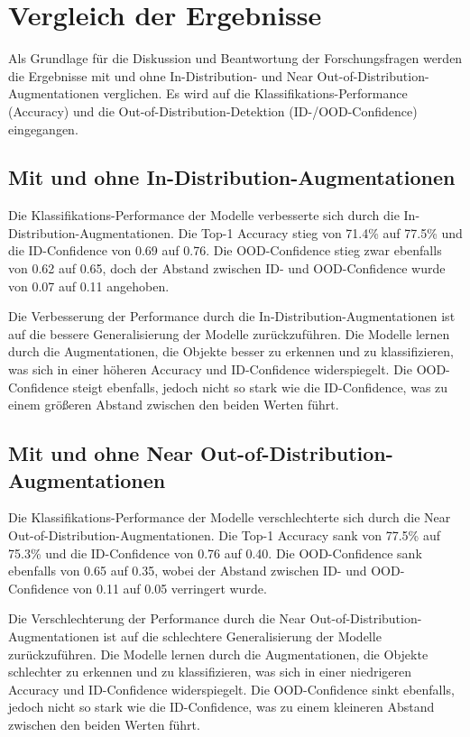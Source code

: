 \section{Vergleich der Ergebnisse} \label{sec:results-comparison}

Als Grundlage für die Diskussion und Beantwortung der Forschungsfragen werden die Ergebnisse mit und ohne In-Distribution- und Near Out-of-Distribution-Augmentationen verglichen. Es wird auf die Klassifikations-Performance (Accuracy) und die Out-of-Distribution-Detektion (ID-/OOD-Confidence) eingegangen.

\subsection{Mit und ohne In-Distribution-Augmentationen} \label{subsec:results-comparison-id}

Die Klassifikations-Performance der Modelle verbesserte sich durch die In-Distribution-Augmentationen. Die Top-1 Accuracy stieg von 71.4\% auf 77.5\% und die ID-Confidence von 0.69 auf 0.76. Die OOD-Confidence stieg zwar ebenfalls von 0.62 auf 0.65, doch der Abstand zwischen ID- und OOD-Confidence wurde von 0.07 auf 0.11 angehoben.

Die Verbesserung der Performance durch die In-Distribution-Augmentationen ist auf die bessere Generalisierung der Modelle zurückzuführen. Die Modelle lernen durch die Augmentationen, die Objekte besser zu erkennen und zu klassifizieren, was sich in einer höheren Accuracy und ID-Confidence widerspiegelt. Die OOD-Confidence steigt ebenfalls, jedoch nicht so stark wie die ID-Confidence, was zu einem größeren Abstand zwischen den beiden Werten führt.

\subsection{Mit und ohne Near Out-of-Distribution-Augmentationen} \label{subsec:results-comparison-ood}

Die Klassifikations-Performance der Modelle verschlechterte sich durch die Near Out-of-Distribution-Augmentationen. Die Top-1 Accuracy sank von 77.5\% auf 75.3\% und die ID-Confidence von 0.76 auf 0.40. Die OOD-Confidence sank ebenfalls von 0.65 auf 0.35, wobei der Abstand zwischen ID- und OOD-Confidence von 0.11 auf 0.05 verringert wurde.

Die Verschlechterung der Performance durch die Near Out-of-Distribution-Augmentationen ist auf die schlechtere Generalisierung der Modelle zurückzuführen. Die Modelle lernen durch die Augmentationen, die Objekte schlechter zu erkennen und zu klassifizieren, was sich in einer niedrigeren Accuracy und ID-Confidence widerspiegelt. Die OOD-Confidence sinkt ebenfalls, jedoch nicht so stark wie die ID-Confidence, was zu einem kleineren Abstand zwischen den beiden Werten führt.
